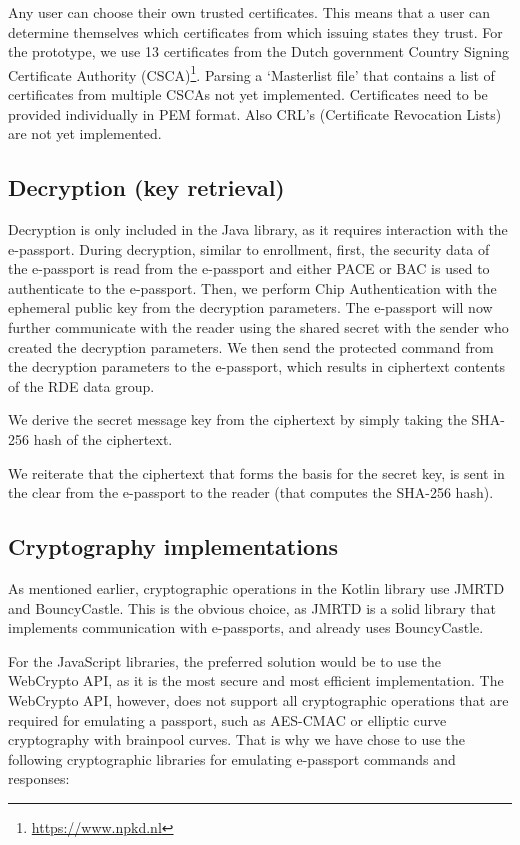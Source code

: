 Any user can choose their own trusted certificates.
This means that a user can determine themselves which certificates from which issuing states they trust.
For the prototype, we use 13 certificates from the Dutch government Country Signing Certificate Authority (CSCA)\footnote{\url{https://www.npkd.nl}}.
Parsing a `Masterlist file' that contains a list of certificates from multiple CSCAs not yet implemented.
Certificates need to be provided individually in PEM format.
Also CRL's (Certificate Revocation Lists) are not yet implemented.

\subsection{Decryption (key retrieval)}\label{subsec:decryption-key-retrieval}
Decryption is only included in the Java library, as it requires interaction with the e-passport.
During decryption, similar to enrollment, first, the security data of the e-passport is read from the e-passport and either PACE or BAC is used to authenticate to the e-passport.
Then, we perform Chip Authentication with the ephemeral public key from the decryption parameters.
The e-passport will now further communicate with the reader using the shared secret with the sender who created the decryption parameters.
We then send the protected command from the decryption parameters to the e-passport, which results in ciphertext contents of the RDE data group.

We derive the secret message key from the ciphertext by simply taking the SHA-256 hash of the ciphertext.

We reiterate that the ciphertext that forms the basis for the secret key, is sent in the clear from the e-passport to the reader (that computes the SHA-256 hash).

\subsection{Cryptography implementations}\label{subsec:cryptography-implementations}
As mentioned earlier, cryptographic operations in the Kotlin library use JMRTD and BouncyCastle.
This is the obvious choice, as JMRTD is a solid library that implements communication with e-passports, and already uses BouncyCastle.

For the JavaScript libraries, the preferred solution would be to use the WebCrypto API, as it is the most secure and most efficient implementation.
The WebCrypto API, however, does not support all cryptographic operations that are required for emulating a passport, such as AES-CMAC or elliptic curve cryptography with brainpool curves.
That is why we have chose to use the following cryptographic libraries for emulating e-passport commands and responses:


